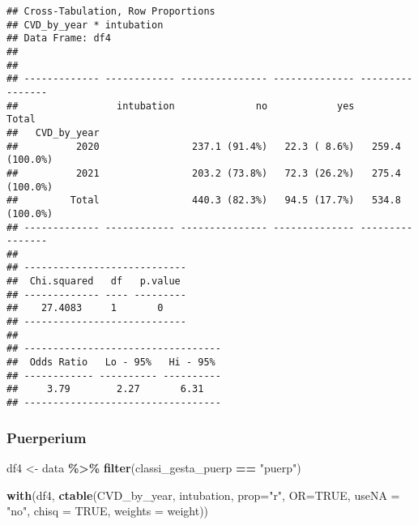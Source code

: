 \documentclass[
]{article}
\newenvironment{Shaded}{\begin{snugshade}}{\end{snugshade}}
\newcommand{\AttributeTok}[1]{\textcolor[rgb]{0.13,0.29,0.53}{#1}}
\newcommand{\ConstantTok}[1]{\textcolor[rgb]{0.56,0.35,0.01}{#1}}
\newcommand{\FunctionTok}[1]{\textcolor[rgb]{0.13,0.29,0.53}{\textbf{#1}}}
\newcommand{\NormalTok}[1]{#1}
\newcommand{\OtherTok}[1]{\textcolor[rgb]{0.56,0.35,0.01}{#1}}
\newcommand{\SpecialCharTok}[1]{\textcolor[rgb]{0.81,0.36,0.00}{\textbf{#1}}}
\newcommand{\StringTok}[1]{\textcolor[rgb]{0.31,0.60,0.02}{#1}}
\begin{document}
\begin{verbatim}
## Cross-Tabulation, Row Proportions  
## CVD_by_year * intubation  
## Data Frame: df4  
## 
## 
## ------------- ------------ --------------- -------------- ----------------
##                 intubation              no            yes            Total
##   CVD_by_year                                                             
##          2020                237.1 (91.4%)   22.3 ( 8.6%)   259.4 (100.0%)
##          2021                203.2 (73.8%)   72.3 (26.2%)   275.4 (100.0%)
##         Total                440.3 (82.3%)   94.5 (17.7%)   534.8 (100.0%)
## ------------- ------------ --------------- -------------- ----------------
## 
## ----------------------------
##  Chi.squared   df   p.value 
## ------------- ---- ---------
##    27.4083     1       0    
## ----------------------------
## 
## ----------------------------------
##  Odds Ratio   Lo - 95%   Hi - 95% 
## ------------ ---------- ----------
##     3.79        2.27       6.31   
## ----------------------------------
\end{verbatim}

\hypertarget{puerperium-10}{%
\subsubsection{Puerperium}\label{puerperium-10}}

\begin{Shaded}
\begin{Highlighting}[]
\NormalTok{df4 }\OtherTok{\textless{}{-}}\NormalTok{ data }\SpecialCharTok{\%\textgreater{}\%} 
  \FunctionTok{filter}\NormalTok{(classi\_gesta\_puerp }\SpecialCharTok{==} \StringTok{"puerp"}\NormalTok{)}

\FunctionTok{with}\NormalTok{(df4, }\FunctionTok{ctable}\NormalTok{(CVD\_by\_year, intubation, }\AttributeTok{prop=}\StringTok{"r"}\NormalTok{, }\AttributeTok{OR=}\ConstantTok{TRUE}\NormalTok{, }\AttributeTok{useNA =} \StringTok{"no"}\NormalTok{, }\AttributeTok{chisq =} \ConstantTok{TRUE}\NormalTok{, }\AttributeTok{weights =}\NormalTok{ weight))}
\end{Highlighting}
\end{Shaded}
\end{document}

